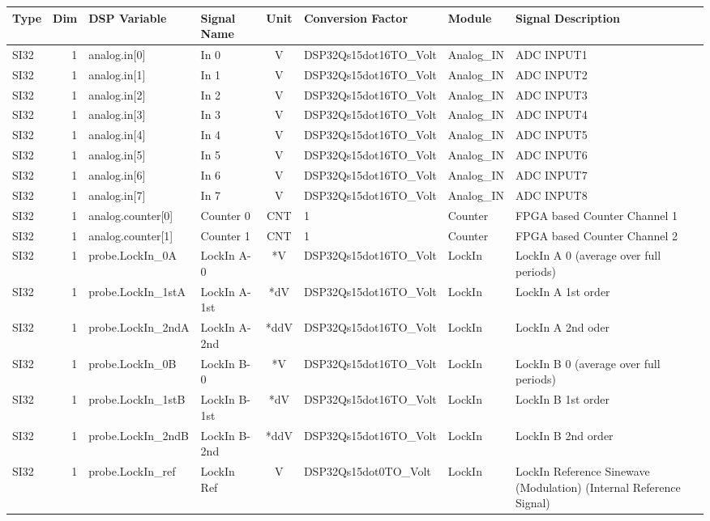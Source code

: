 \begin{tabular}{|l|r|l|l|c|l|l|l|}
Type & Dim & DSP Variable & Signal Name & Unit & Conversion Factor & Module & Signal Description \\ \hline
SI32 & 1 & analog.in[0] &  In 0 &  V &  DSP32Qs15dot16TO\_Volt &  Analog\_IN &  ADC INPUT1 \\
SI32 & 1 & analog.in[1] &  In 1 &  V &  DSP32Qs15dot16TO\_Volt &  Analog\_IN &  ADC INPUT2 \\
SI32 & 1 & analog.in[2] &  In 2 &  V &  DSP32Qs15dot16TO\_Volt &  Analog\_IN &  ADC INPUT3 \\
SI32 & 1 & analog.in[3] &  In 3 &  V &  DSP32Qs15dot16TO\_Volt &  Analog\_IN &  ADC INPUT4 \\
SI32 & 1 & analog.in[4] &  In 4 &  V &  DSP32Qs15dot16TO\_Volt &  Analog\_IN &  ADC INPUT5 \\
SI32 & 1 & analog.in[5] &  In 5 &  V &  DSP32Qs15dot16TO\_Volt &  Analog\_IN &  ADC INPUT6 \\
SI32 & 1 & analog.in[6] &  In 6 &  V &  DSP32Qs15dot16TO\_Volt &  Analog\_IN &  ADC INPUT7 \\
SI32 & 1 & analog.in[7] &  In 7 &  V &  DSP32Qs15dot16TO\_Volt &  Analog\_IN &  ADC INPUT8 \\
SI32 & 1 & analog.counter[0] &  Counter 0 &  CNT &  1 &  Counter &  FPGA based Counter Channel 1 \\
SI32 & 1 & analog.counter[1] &  Counter 1 &  CNT &  1 &  Counter &  FPGA based Counter Channel 2 \\
SI32 & 1 & probe.LockIn\_0A &      LockIn A-0 &    *V &    DSP32Qs15dot16TO\_Volt &  LockIn &  LockIn A 0 (average over full periods) \\
SI32 & 1 & probe.LockIn\_1stA &    LockIn A-1st &  *dV &   DSP32Qs15dot16TO\_Volt &  LockIn &  LockIn A 1st order \\
SI32 & 1 & probe.LockIn\_2ndA &    LockIn A-2nd &  *ddV &  DSP32Qs15dot16TO\_Volt &  LockIn &  LockIn A 2nd oder \\
SI32 & 1 & probe.LockIn\_0B &      LockIn B-0 &    *V &    DSP32Qs15dot16TO\_Volt &  LockIn &  LockIn B 0 (average over full periods) \\
SI32 & 1 & probe.LockIn\_1stB &    LockIn B-1st &  *dV &   DSP32Qs15dot16TO\_Volt &  LockIn &  LockIn B 1st order \\
SI32 & 1 & probe.LockIn\_2ndB &    LockIn B-2nd &  *ddV &  DSP32Qs15dot16TO\_Volt &  LockIn &  LockIn B 2nd order \\
SI32 & 1 & probe.LockIn\_ref &     LockIn Ref &     V &    DSP32Qs15dot0TO\_Volt &   LockIn &  LockIn Reference Sinewave (Modulation) (Internal Reference Signal) \\

\end{tabular}
